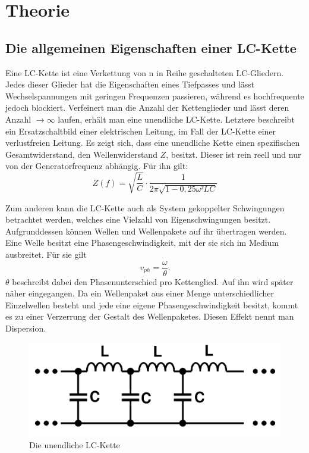 
\section{Theorie}
\label{sec:Theorie}

\subsection{Die allgemeinen Eigenschaften einer LC-Kette}
Eine LC-Kette ist eine Verkettung von n in Reihe geschalteten LC-Gliedern.
 Jedes dieser Glieder hat die Eigenschaften eines Tiefpasses und lässt
  Wechselspannungen mit geringen Frequenzen passieren, während es hochfrequente jedoch
   blockiert. Verfeinert man die Anzahl der Kettenglieder und lässt
   deren Anzahl $\to \infty$ laufen, erhält man eine unendliche LC-Kette. Letztere
    beschreibt ein Ersatzschaltbild einer elektrischen Leitung, im Fall der
     LC-Kette einer verlustfreien Leitung. Es zeigt sich, dass eine unendliche
      Kette einen spezifischen Gesamtwiderstand, den Wellenwiderstand $Z$, besitzt.
      Dieser ist rein reell und nur von der Generatorfrequenz abhängig. Für ihn gilt:
      \begin{equation}
        Z(f) = \sqrt{\frac{L}{C}} \cdot \frac{1}{2\pi \sqrt{1-0,25\omega² LC}}
      \end{equation}

 Zum anderen kann die LC-Kette auch als System gekoppelter
    Schwingungen betrachtet werden, welches eine Vielzahl von Eigenschwingungen besitzt.
      Aufgrunddessen können Wellen und Wellenpakete auf ihr übertragen werden.
	Eine Welle besitzt eine Phasengeschwindigkeit, mit der sie sich im Medium ausbreitet. Für sie gilt
\begin{equation}
v_{ph} = \frac{\omega}{\theta}\text{.}
\end{equation} 
	$\theta$ beschreibt dabei den Phasenunterschied pro Kettenglied. Auf ihn wird später näher eingegangen.
     Da ein Wellenpaket aus einer Menge unterschiedlicher Einzelwellen besteht
      und jede eine eigene Phasengeschwindigkeit besitzt, kommt es zu einer Verzerrung
  der Gestalt des Wellenpaketes. Diesen Effekt nennt man Dispersion.


     \begin{figure}[H]
       \centering
       \includegraphics[width=\linewidth-200pt,height=\textheight-200pt,keepaspectratio]{content/Grafiken/LCKette.png}
       \caption{Die unendliche LC-Kette}
       \label{fig:LC-Kette}
     \end{figure}

